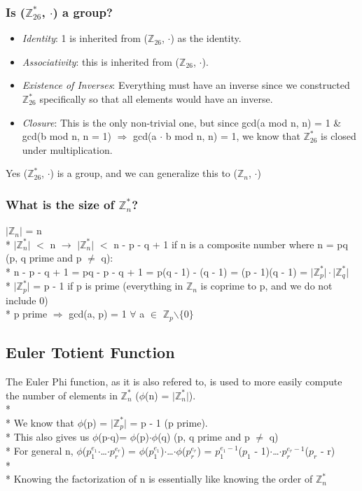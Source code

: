 \documentclass[11pt]{article}
\begin{document}
\subsubsection{Is ($\mathbb{Z}^*_{26}$, $\cdot$) a group?}
\begin{itemize}
  \item \emph{Identity}: 1 is inherited from ($\mathbb{Z}_{26}$, $\cdot$) as the
  identity.
  \item \emph{Associativity}: this is inherited from ($\mathbb{Z}_{26}$, $\cdot$).
  \item \emph{Existence of Inverses}: Everything must have an inverse since we
  constructed $\mathbb{Z}^*_{26}$ specifically so that all elements would have
  an inverse.
  \item \emph{Closure}: This is the only non-trivial one, but since gcd(a mod n,
  n) = 1 \& gcd(b mod n, n = 1) $\Longrightarrow$ gcd(a $\cdot$ b mod n, n) = 1, we know
  that $\mathbb{Z}^*_{26}$ is closed under multiplication.
\end{itemize}
Yes ($\mathbb{Z}^*_{26}$, $\cdot$) is a group, and we can generalize this to
($\mathbb{Z}_{n}$, $\cdot$)
\subsubsection{What is the size of $\mathbb{Z}^*_{n}$?}
$\lvert$$\mathbb{Z}_{n}$$\rvert$ = n\\*
$\lvert$$\mathbb{Z}^*_{n}$$\rvert$ $<$ n $\rightarrow$
$\lvert$$\mathbb{Z}^*_{n}$$\rvert$ $<$ n - p - q + 1 if n is a composite number
where n = pq (p, q prime and p $\neq$ q):\\*
\indent n - p - q + 1 = pq - p - q + 1 = p(q - 1) - (q - 1) = (p - 1)(q - 1) =
$\lvert$$\mathbb{Z}^*_{p}$$\rvert \cdot \lvert$$\mathbb{Z}^*_{q}$$\rvert$\\*
$\lvert$$\mathbb{Z}^*_{p}$$\rvert$ = p - 1 if p is prime (everything in
$\mathbb{Z}_{n}$ is coprime to p, and we do not include 0)\\* \indent p prime
$\Longrightarrow$ gcd(a, p) = 1 $\forall$ a $\in$ $\mathbb{Z}_{p}$$\backslash$$\{$0$\}$

\subsection{Euler Totient Function}
The Euler Phi function, as it is also refered to, is used to more easily compute
the number of elements in $\mathbb{Z}^*_n$ ($\phi$(n) =
$\lvert$$\mathbb{Z}^*_{n}$$\rvert$).\\*\\*
We know that $\phi$(p) = $\lvert$$\mathbb{Z}^*_{p}$$\rvert$ = p - 1 (p
prime).\\*
This also gives us $\phi$(p$\cdot$q)= $\phi$(p)$\cdot$$\phi$(q) (p, q prime and
p $\neq$ q)\\*
For general n, $\phi$($p^{e_1}_1$$\cdot$\ldots$\cdot$$p^{e_r}_r$) =
$\phi$($p^{e_1}_1$)$\cdot$\ldots$\cdot\phi$($p^{e_r}_r$) = $p^{e_1-1}_1$($p_1$
- 1)$\cdot$\ldots$\cdot$$p^{e_r-1}_r$($p_r$ - r)\\*\\*
Knowing the factorization of n is essentially like knowing the order of
$\mathbb{Z}^*_{n}$
\end{document}
